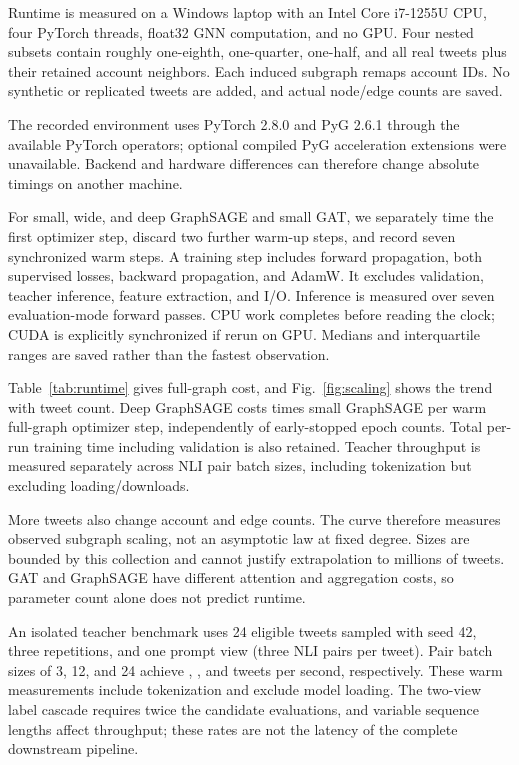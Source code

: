 \documentclass[conference]{IEEEtran}
\begin{document}
Runtime is measured on a Windows laptop with an Intel Core i7-1255U CPU, four PyTorch threads, float32 GNN computation, and no GPU. Four nested subsets contain roughly one-eighth, one-quarter, one-half, and all real tweets plus their retained account neighbors. Each induced subgraph remaps account IDs. No synthetic or replicated tweets are added, and actual node/edge counts are saved.

The recorded environment uses PyTorch 2.8.0 and PyG 2.6.1 through the available PyTorch operators; optional compiled PyG acceleration extensions were unavailable. Backend and hardware differences can therefore change absolute timings on another machine.

For small, wide, and deep GraphSAGE and small GAT, we separately time the first optimizer step, discard two further warm-up steps, and record seven synchronized warm steps. A training step includes forward propagation, both supervised losses, backward propagation, and AdamW. It excludes validation, teacher inference, feature extraction, and I/O. Inference is measured over seven evaluation-mode forward passes. CPU work completes before reading the clock; CUDA is explicitly synchronized if rerun on GPU. Medians and interquartile ranges are saved rather than the fastest observation.

Table~\ref{tab:runtime} gives full-graph cost, and Fig.~\ref{fig:scaling} shows the trend with tweet count. Deep GraphSAGE costs \LargeTimeRatio{} times small GraphSAGE per warm full-graph optimizer step, independently of early-stopped epoch counts. Total per-run training time including validation is also retained. Teacher throughput is measured separately across NLI pair batch sizes, including tokenization but excluding loading/downloads.

More tweets also change account and edge counts. The curve therefore measures observed subgraph scaling, not an asymptotic law at fixed degree. Sizes are bounded by this collection and cannot justify extrapolation to millions of tweets. GAT and GraphSAGE have different attention and aggregation costs, so parameter count alone does not predict runtime.

An isolated teacher benchmark uses 24 eligible tweets sampled with seed 42, three repetitions, and one prompt view (three NLI pairs per tweet). Pair batch sizes of 3, 12, and 24 achieve \TeacherRateSmall{}, \TeacherRateMedium{}, and \TeacherRateLarge{} tweets per second, respectively. These warm measurements include tokenization and exclude model loading. The two-view label cascade requires twice the candidate evaluations, and variable sequence lengths affect throughput; these rates are not the latency of the complete downstream pipeline.
\end{document}
